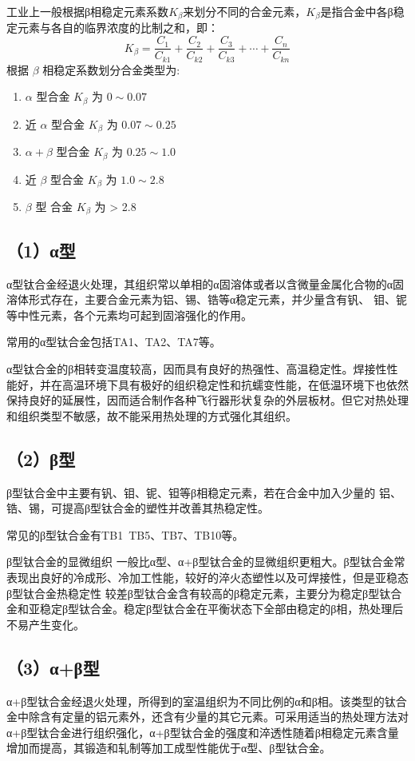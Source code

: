 工业上一般根据β相稳定元素系数$K_{\beta}$来划分不同的合金元素，$K_{\beta}$是指合金中各β稳定元素与各自的临界浓度的比制之和，即：
$$
K_{\beta}=\frac{ C_{1} }{C_{k1}}+\frac{ C_{2} }{C_{k2}}+\frac{ C_{3} }{C_{k3}}+\cdots+\frac{ C_{n} }{C_{kn}}
$$
根据 $\beta$ 相稳定系数划分合金类型为:
\begin{enumerate}
	\item  $\alpha$ 型合金 $K_\beta$ 为 $0 \sim 0.07$
	\item 近 $\alpha$ 型合金 $K_\beta$ 为 $0.07 \sim 0.25$
	\item $\alpha+\beta$ 型合金 $K_\beta$ 为 $0.25 \sim 1.0$
	\item 近 $\beta$ 型合金 $K_\beta$ 为 $1.0 \sim 2.8$
	\item $\beta$ 型 合金 $K_\beta$ 为 > 2.8
\end{enumerate}
\subsection*{（1）α型}
α型钛合金经退火处理，其组织常以单相的α固溶体或者以含微量金属化合物的α固溶体形式存在，主要合金元素为铝、锡、锆等α稳定元素，并少量含有钒、 钼、铌等中性元素，各个元素均可起到固溶强化的作用。

常用的α型钛合金包括TA1、TA2、TA7等。

α型钛合金的β相转变温度较高，因而具有良好的热强性、高温稳定性。焊接性性能好，并在高温环境下具有极好的组织稳定性和抗蠕变性能，在低温环境下也依然保持良好的延展性，因而适合制作各种飞行器形状复杂的外层板材。但它对热处理和组织类型不敏感，故不能采用热处理的方式强化其组织\cite{TiandAl}。
\subsection*{（2）β型}
β型钛合金中主要有钒、钼、铌、钽等β相稳定元素，若在合金中加入少量的 铝、锆、锡，可提高β型钛合金的塑性并改善其热稳定性。

常见的β型钛合金有TB1~TB5、TB7、TB10等。

β型钛合金的显微组织 一般比α型、α+β型钛合金的显微组织更粗大。β型钛合金常表现出良好的冷成形、冷加工性能，较好的淬火态塑性以及可焊接性，但是亚稳态β型钛合金热稳定性 较差β型钛合金含有较高的β稳定元素，主要分为稳定β型钛合金和亚稳定β型钛合金。稳定β型钛合金在平衡状态下全部由稳定的β相，热处理后不易产生变化。
\subsection*{（3）α+β型}
α+β型钛合金经退火处理，所得到的室温组织为不同比例的α和β相。该类型的钛合金中除含有定量的铝元素外，还含有少量的其它元素。可采用适当的热处理方法对α+β型钛合金进行组织强化，α+β型钛合金的强度和淬透性随着β相稳定元素含量增加而提高，其锻造和轧制等加工成型性能优于α型、β型钛合金。


